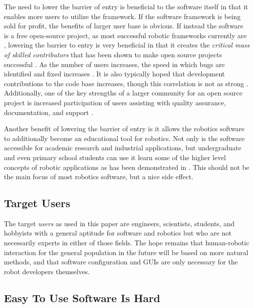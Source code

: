 \documentclass[10pt,journal,compsoc]{joser1}
\begin{document}
{The need to lower the barrier of entry is beneficial to the software itself in that it enables more users to utilize the framework. If the software framework is being sold for profit, the benefits of larger user base is obvious. If instead the software is a free open-source project, as most successful robotic frameworks currently are \cite{makarenko2007benefits}, lowering the barrier to entry is very beneficial in that it creates the \textit{critical mass of skilled contributors} that has been shown to make open source projects successful \cite{bruyninckx2001open}. As the number of users increases, the speed in which bugs are identified and fixed increases \cite{schmidt1999software}. It is also typically hoped that development contributions to the code base increases, though this correlation is not as strong \cite{schmidt1999software}. Additionally, one of the key strengths of a larger community for an open source project is increased participation of users assisting with quality assurance, documentation, and support \cite{schmidt2001leveraging}.

Another benefit of lowering the barrier of entry is it allows the robotics software to additionally become an educational tool for robotics. Not only is the software accessible for academic research and industrial applications, but undergraduate and even primary school students can use it learn some of the higher level concepts of robotic applications as has been demonstrated in \cite{correll2013one, moll2011teaching, ayanian2010development}. This should not be the main focus of most robotics software, but a nice side effect.

\subsection{Target Users}

The target \textit{users} as used in this paper are engineers, scientists, students, and hobbyists with a general aptitude for software and robotics but who are not necessarily experts in either of those fields. The hope remains that human-robotic interaction for the general population in the future will be based on more natural methods, and that software configuration and GUIs are only necessary for the robot developers themselves.

\subsection{Easy To Use Software Is Hard}

}
\end{document}
